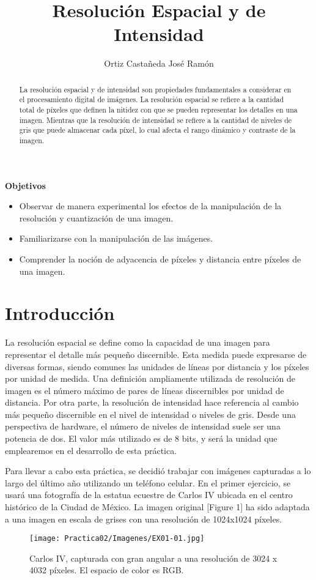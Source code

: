 \documentclass[
  journal=largetwo,
  manuscript=Practica-Dos,
  year=2024-1, %
  volume=37,
  spanish, %
]{cup-journal}
\title{Resolución Espacial y de Intensidad}
\author{Ortiz Castañeda José Ramón}
\affiliation{Facultad de Ciencias, UNAM}
\begin{document}
\begin{abstract}
La resolución espacial y de intensidad son propiedades fundamentales a considerar en el procesamiento digital de imágenes. La resolución espacial se refiere a la cantidad total de píxeles que definen la nitidez con que se pueden representar los detalles en una imagen. Mientras que la resolución de intensidad se refiere a la cantidad de niveles de gris que puede almacenar cada píxel, lo cual afecta el rango dinámico y contraste de la imagen.
\end{abstract}

\noindent \textbf{Objetivos}
\begin{itemize}
    \item Observar de manera experimental los efectos de la manipulación de la resolución y cuantización de una imagen.
    \item Familiarizarse con la manipulación de las imágenes.
    \item Comprender la noción de adyacencia de píxeles y distancia entre píxeles de una imagen.
\end{itemize}

\section{Introducción}
La resolución espacial se define como la capacidad de una imagen para representar el detalle más pequeño discernible. Esta medida puede expresarse de diversas formas, siendo comunes las unidades de líneas por distancia y los píxeles por unidad de medida. Una definición ampliamente utilizada de resolución de imagen es el número máximo de pares de líneas discernibles por unidad de distancia. Por otra parte, la resolución de intensidad hace referencia al cambio más pequeño discernible en el nivel de intensidad o niveles de gris. Desde una perspectiva de hardware, el número de niveles de intensidad suele ser una potencia de dos. El valor más utilizado es de 8 bits, y será la unidad que emplearemos en el desarrollo de esta práctica.

Para llevar a cabo esta práctica, se decidió trabajar con imágenes capturadas a lo largo del último año utilizando un teléfono celular. En el primer ejercicio, se usará una fotografía de la estatua ecuestre de Carlos IV ubicada en el centro histórico de la Ciudad de México. La imagen original [Figure 1] ha sido adaptada a una imagen en escala de grises con una resolución de 1024x1024 píxeles.

\begin{figure}
\centering
\texttt{[image: Practica02/Imagenes/EX01-01.jpg]}
\caption{Carlos IV, capturada con gran angular a una resolución de 3024 x 4032 píxeles. El espacio de color es RGB.}
\label{fig_sim}
\end{figure}
\end{document}
